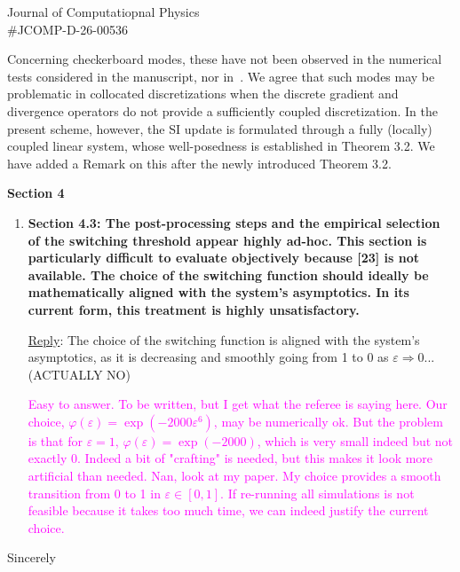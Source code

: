 \documentclass[letter,11pt]{letter}
\newcommand{\eps}{\varepsilon}
\begin{document}
\begin{letter}{Journal of Computatiopnal Physics\\\#JCOMP-D-26-00536}
\begin{enumerate}
	Concerning checkerboard modes, these have not been observed in the numerical tests considered in the manuscript, nor in~\cite{CKKM}. We agree that such modes may be problematic in collocated discretizations when the discrete gradient and divergence operators do not provide a sufficiently coupled discretization. In the present scheme, however, the SI update is formulated through a fully (locally) coupled linear system, whose well-posedness is established in Theorem 3.2.
	We have added a Remark on this after the newly introduced Theorem 3.2.

\end{enumerate}

{\bf Section 4}
\begin{enumerate}
	\medskip
	\item
	{\bf Section 4.3: The post-processing steps and the empirical selection of the switching threshold appear highly ad-hoc. This section is particularly difficult to evaluate objectively because [23] is not available. The choice of the switching function should ideally be mathematically aligned with the system’s asymptotics. In its current form, this treatment is highly unsatisfactory.}
	
	\medskip
	{\sc\underline{Reply}}: 
	The choice of the switching function is aligned with the system’s asymptotics, as it is decreasing and smoothly going from 1 to 0 as $\varepsilon \Rightarrow 0$... (ACTUALLY NO)
	
	
	
   {\large \textcolor{magenta}{Easy to answer. To be written, but I get what the referee is saying here. Our choice, $\varphi(\eps)=\exp(-2000\eps^6)$, may be numerically ok. But the problem is that for $\eps=1$, $\varphi(\eps)=\exp(-2000)$, which is very small indeed but not exactly $0$. Indeed a bit of "crafting" is needed, but this makes it look more artificial than needed. Nan, look at my paper. My choice provides a smooth transition from 0 to 1 in $\varepsilon\in[0,1]$.
   If re-running all simulations is not feasible because it takes too much time, we can indeed justify the current choice.
   }}
	

\end{enumerate}

\vspace*{2cm}
\closing{Sincerely} %




\end{letter}
\end{document}
